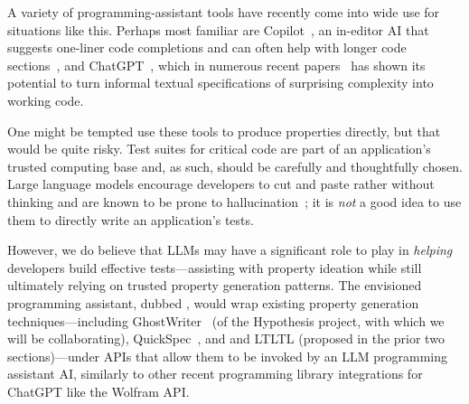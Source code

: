 A variety of
programming-assistant tools have recently come into wide use for situations
like this. Perhaps most familiar are
Copilot~\cite{tool:copilot}, an in-editor AI that suggests one-liner code
completions and can often help with longer code
sections~\cite{ref:dohmke2022github}, and ChatGPT~\cite{tool:chatgpt}, which in
numerous recent papers~\cite{ref:bubeck2023sparks,ref:savelka2023thrilled} has shown its potential to turn
informal textual specifications of surprising complexity into working code.

One might be tempted use these tools to produce properties directly,
but that would be quite risky. Test suites for critical code are part
of an application's {trusted computing base} and, as such, should
be carefully and thoughtfully chosen. Large language models encourage developers to cut and
paste rather without thinking and are known to be prone
to hallucination~\cite{ji2023survey}; it is {\em not} a good idea
to use them to directly write an application's tests.


However, we do believe that LLMs may have a significant role to play
in {\em helping} developers build effective tests---assisting with
property ideation while still ultimately relying on trusted
property generation patterns.
The envisioned programming assistant, dubbed {\em \GhostChat}, would wrap existing property generation
techniques---including GhostWriter~\cite{ref:ghostwriter} (of the Hypothesis
project, with which we will be collaborating), QuickSpec~\cite{ref:claessen2010quickspec},
and \Mica{} and LTLTL (proposed in the prior two sections)---under APIs that allow them to be invoked by
an LLM programming assistant AI, similarly to other recent programming library
integrations for ChatGPT like the Wolfram API.

